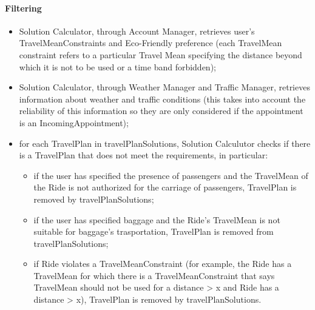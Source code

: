 	\paragraph{Filtering}
	\begin{itemize}
		\item Solution Calculator, through Account Manager, retrieves user's TravelMeanConstraints and Eco-Friendly preference (each TravelMean constraint refers to a particular Travel Mean specifying the distance beyond which it is not to be used or a time band forbidden);
		
		\item Solution Calculator, through Weather Manager and Traffic Manager, retrieves information about weather and traffic conditions (this takes into account the reliability of this information so they are only considered if the appointment is an IncomingAppointment);
		
		\item  for each TravelPlan in travelPlanSolutions, Solution Calculutor checks if there is a TravelPlan that does not meet the requirements, in particular: 
		
		\begin{itemize}	
			\item if the user has specified the presence of passengers and the TravelMean of the Ride is not authorized for the carriage of passengers, TravelPlan is removed by travelPlanSolutions;
			
			\item if the user has specified baggage and the Ride's TravelMean is not suitable for baggage's trasportation, TravelPlan is removed from travelPlanSolutions;
			
			\item if Ride violates a TravelMeanConstraint (for example, the Ride has a TravelMean for which there is a TravelMeanConstraint that says TravelMean should not be used for a distance > x and Ride has a distance > x), TravelPlan is removed by travelPlanSolutions. 
		\end{itemize}
		
		\end{itemize}
	
	
	
